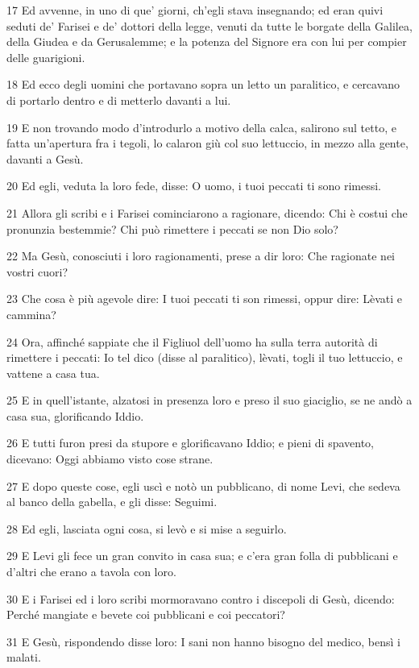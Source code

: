 \par 17 Ed avvenne, in uno di que' giorni, ch'egli stava insegnando; ed eran quivi seduti de' Farisei e de' dottori della legge, venuti da tutte le borgate della Galilea, della Giudea e da Gerusalemme; e la potenza del Signore era con lui per compier delle guarigioni.
\par 18 Ed ecco degli uomini che portavano sopra un letto un paralitico, e cercavano di portarlo dentro e di metterlo davanti a lui.
\par 19 E non trovando modo d'introdurlo a motivo della calca, salirono sul tetto, e fatta un'apertura fra i tegoli, lo calaron giù col suo lettuccio, in mezzo alla gente, davanti a Gesù.
\par 20 Ed egli, veduta la loro fede, disse: O uomo, i tuoi peccati ti sono rimessi.
\par 21 Allora gli scribi e i Farisei cominciarono a ragionare, dicendo: Chi è costui che pronunzia bestemmie? Chi può rimettere i peccati se non Dio solo?
\par 22 Ma Gesù, conosciuti i loro ragionamenti, prese a dir loro: Che ragionate nei vostri cuori?
\par 23 Che cosa è più agevole dire: I tuoi peccati ti son rimessi, oppur dire: Lèvati e cammina?
\par 24 Ora, affinché sappiate che il Figliuol dell'uomo ha sulla terra autorità di rimettere i peccati: Io tel dico (disse al paralitico), lèvati, togli il tuo lettuccio, e vattene a casa tua.
\par 25 E in quell'istante, alzatosi in presenza loro e preso il suo giaciglio, se ne andò a casa sua, glorificando Iddio.
\par 26 E tutti furon presi da stupore e glorificavano Iddio; e pieni di spavento, dicevano: Oggi abbiamo visto cose strane.
\par 27 E dopo queste cose, egli uscì e notò un pubblicano, di nome Levi, che sedeva al banco della gabella, e gli disse: Seguimi.
\par 28 Ed egli, lasciata ogni cosa, si levò e si mise a seguirlo.
\par 29 E Levi gli fece un gran convito in casa sua; e c'era gran folla di pubblicani e d'altri che erano a tavola con loro.
\par 30 E i Farisei ed i loro scribi mormoravano contro i discepoli di Gesù, dicendo: Perché mangiate e bevete coi pubblicani e coi peccatori?
\par 31 E Gesù, rispondendo disse loro: I sani non hanno bisogno del medico, bensì i malati.
